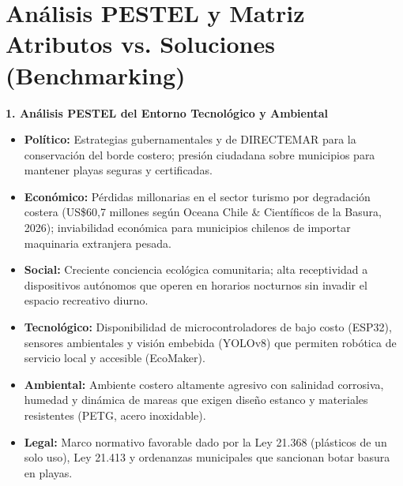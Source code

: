 \documentclass[12pt,letterpaper]{article}
\begin{document}
\section{Análisis PESTEL y Matriz Atributos vs. Soluciones (Benchmarking)}
\label{anexo:pestel}

\noindent\textbf{1. Análisis PESTEL del Entorno Tecnológico y Ambiental}
\begin{itemize}[leftmargin=*, noitemsep]
    \item \textbf{Político:} Estrategias gubernamentales y de DIRECTEMAR para la conservación del borde costero; presión ciudadana sobre municipios para mantener playas seguras y certificadas.
    \item \textbf{Económico:} Pérdidas millonarias en el sector turismo por degradación costera (US\$60,7 millones según Oceana Chile \& Científicos de la Basura, 2026); inviabilidad económica para municipios chilenos de importar maquinaria extranjera pesada.
    \item \textbf{Social:} Creciente conciencia ecológica comunitaria; alta receptividad a dispositivos autónomos que operen en horarios nocturnos sin invadir el espacio recreativo diurno.
    \item \textbf{Tecnológico:} Disponibilidad de microcontroladores de bajo costo (ESP32), sensores ambientales y visión embebida (YOLOv8) que permiten robótica de servicio local y accesible (EcoMaker).
    \item \textbf{Ambiental:} Ambiente costero altamente agresivo con salinidad corrosiva, humedad y dinámica de mareas que exigen diseño estanco y materiales resistentes (PETG, acero inoxidable).
    \item \textbf{Legal:} Marco normativo favorable dado por la Ley 21.368 (plásticos de un solo uso), Ley 21.413 y ordenanzas municipales que sancionan botar basura en playas.
\end{itemize}
\end{document}
